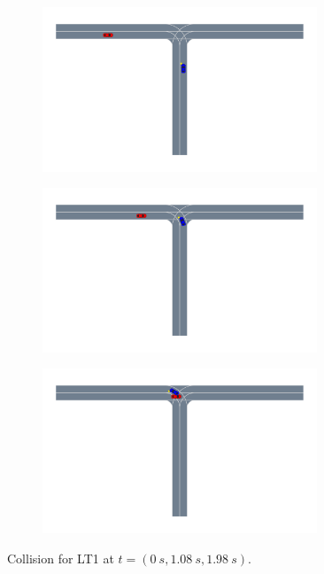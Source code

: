 \begin{figure}
    \centering
    \begin{subfigure}[t]{0.33\columnwidth}
        \centering
        \includegraphics[width=0.9\textwidth, trim={10cm 16.5cm 22cm 0},clip]{figures/interpretable_validation/2car_res1_frame_01.pdf}
    \end{subfigure}%
   \begin{subfigure}[t]{0.33\columnwidth}
        \centering
        \includegraphics[width=0.9\textwidth, trim={10cm 16.5cm 22cm 0},clip]{figures/interpretable_validation/2car_res1_frame_07.pdf}
    \end{subfigure}%
    \begin{subfigure}[t]{0.33\columnwidth}
        \centering
        \includegraphics[width=0.9\textwidth, trim={10cm 16.5cm 22cm 0},clip]{figures/interpretable_validation/2car_res1_frame_12.pdf}
    \end{subfigure}
    \caption{Collision for LT1 at $t=(\SI{0}{s}, \SI{1.08}{s}, \SI{1.98}{s})$.}
    \label{fig:2car_LT1}
\end{figure}


